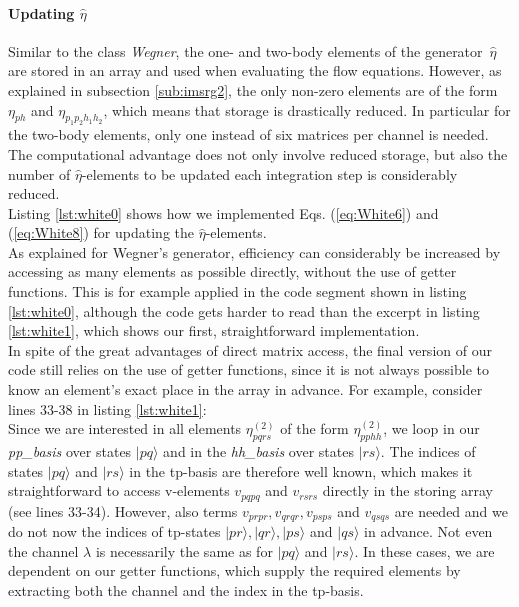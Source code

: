\paragraph{Updating $\hat{\eta}$}
Similar to the class \textit{Wegner}, the one- and two-body elements of the \mbox{generator $\hat{\eta}$} are stored in an array and used when evaluating the flow equations. However, as explained in subsection \ref{sub:imsrg2}, the only non-zero elements are of the form $\eta_{ph}$ and $\eta_{p_1p_2h_1h_2}$, which means that storage is drastically reduced. In particular for the two-body elements, only one instead of six matrices per channel is needed. \\
The computational advantage does not only involve reduced storage, but also the number of $\hat{\eta}$-elements to be updated each integration step is considerably reduced. \\
Listing \ref{lst:white0} shows how we implemented Eqs. (\ref{eq:White6}) and (\ref{eq:White8}) for updating the $\hat{\eta}$-elements.\\
As explained for Wegner's generator, efficiency can considerably be increased  by accessing as many elements as possible directly, without the use of getter functions. This is for example applied in the code segment shown in listing \ref{lst:white0}, although the code gets harder to read than the excerpt in listing \ref{lst:white1}, which shows our first, straightforward implementation.\\
In spite of the great advantages of direct matrix access, the final version of our code still relies on the use of getter functions, since it is not always possible to know an element's exact place in the array in advance. For example, consider lines 33-38 in listing \ref{lst:white1}:\\
Since we are interested in all elements $\eta_{pqrs}^{(2)}$ of the form $\eta_{pphh}^{(2)}$, we loop in our \textit{pp\_basis} over states $|pq\rangle$ and in the \textit{hh\_basis} over states $|rs\rangle$. The indices of states $|pq\rangle$ and $|rs\rangle$ in the tp-basis are therefore well known, which makes it straightforward to access v-elements $v_{pqpq}$ and $v_{rsrs}$ directly in the storing array (see lines 33-34). However, also terms $v_{prpr},v_{qrqr},v_{psps}$ and $v_{qsqs}$ are needed and we do not now the indices of tp-states $|pr\rangle, |qr\rangle, |ps\rangle$ and $|qs\rangle$ in advance. Not even the channel $\lambda$ is necessarily the same as for $|pq\rangle$ and $|rs\rangle$. In these cases, we are dependent on our getter functions, which supply the required elements by extracting both the channel and the index in the tp-basis.

